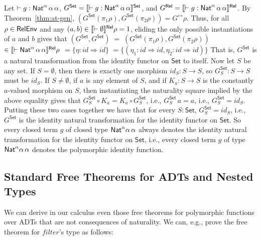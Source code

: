 \documentclass{lmcs}
\theoremstyle{plain}\newtheorem{satz}[thm]{Satz}
\newcommand{\set}{\mathsf{Set}}
\renewcommand{\id}{\mathit{id}}
\begin{document}
Let $ \vdash g : \mathsf{Nat}^\alpha \,\alpha\,\alpha$, \/$G^\set =
\setsem{\vdash g : \Nat^\alpha \,\alpha\,\alpha}$, and $G^{\mathsf{Rel}} =
\llbracket{\vdash g : \mathsf{Nat}^\alpha \,\alpha\,\alpha}\rrbracket^{\mathsf{Rel}}$.  By
Theorem~\ref{thm:at-gen}, $(G^\set(\pi_1\rho),G^\set(\pi_2\rho)) =
G^\rel\rho$. Thus, for all $\rho \in \mathsf{RelEnv}$ and any $(a, b) \in
\llbracket{\vdash \emptyset}\rrbracket^{\mathsf{Rel}}\rho = 1$, eliding the only possible
instantiations of $a$ and $b$ gives that $(G^\set, G^\set) \; = \;
(G^\set(\pi_1 \rho), G^\set (\pi_2 \rho))$ $ \in \llbracket{\vdash
  \mathsf{Nat}^\alpha \,\alpha\,\alpha}\rrbracket^{\mathsf{Rel}}\rho$ $ = \{\eta : \id \Rightarrow
\id\}$ $ = \{(\eta_1 : \id \Rightarrow \id, \eta_2 : \id \Rightarrow
\id)\}$ That is, $G^\set$ is a natural transformation from the
identity functor on $\set$ to itself. Now let $S$ be any set.  If $S =
\emptyset$, then there is exactly one morphism $\id_S: S \to S$, so
$G^\set_S : S \to S$ must be $\id_S$. If $S \not = \emptyset$, if $a$
is any element of $S$, and if $K_a :S \to S$ is the constantly
$a$-valued morphism on $S$, then instantiating the naturality square
implied by the above equality gives that $G^\set_S \circ K_a = K_a
\circ G^\set_S$, i.e., $G^\set_S \, a = a$, i.e., $G^\set_S = \id_S$.
Putting these two cases together we have that for every $S : \set$,
$G^\set_S = \id_S$, i.e., $G^\set$ is the identity natural
transformation for the identity functor on $\set$. So every closed
term $g$ of closed type $\mathsf{Nat}^\alpha\alpha\,\alpha$ always denotes the
identity natural transformation for the identity functor on $\set$,
i.e., every closed term $g$ of type $\mathsf{Nat}^\alpha\alpha\,\alpha$
denotes the polymorphic identity function.

\subsection{Standard Free Theorems for ADTs and Nested
  Types}\label{sec:ft-adt} 

We can derive in our calculus even those free theorems for polymorphic
functions over ADTs that are not consequences of naturality.  We can,
e.g., prove the free theorem for $\mathit{filter}$'s type as follows:
\end{document}
